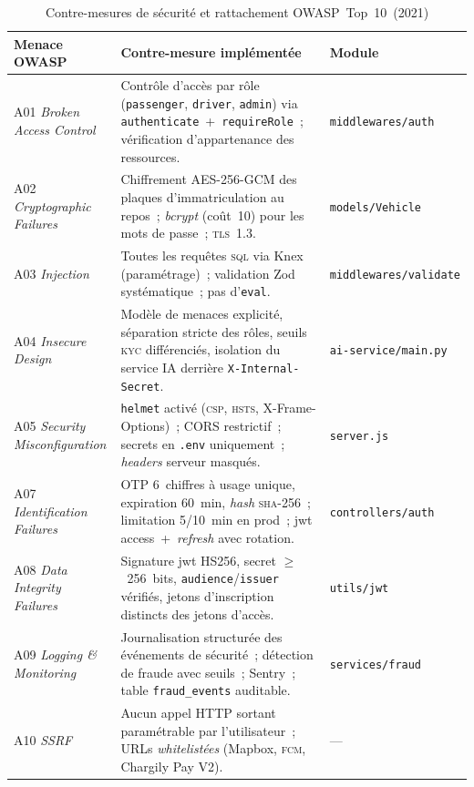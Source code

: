 \documentclass[12pt, a4paper, oneside]{report}
\begin{document}
\begin{table}[H]
\centering
\footnotesize
\renewcommand{\arraystretch}{1.25}
\begin{tabular}{|p{3.0cm}|p{8.8cm}|p{3.0cm}|}
\hline
\rowcolor{rohlight}
\textbf{Menace OWASP} & \textbf{Contre-mesure implémentée} & \textbf{Module} \\
\hline
A01 \textit{Broken Access Control} &
Contrôle d'accès par rôle (\texttt{passenger}, \texttt{driver}, \texttt{admin}) via \texttt{authenticate}~+~\texttt{requireRole}~; vérification d'appartenance des ressources. &
\texttt{middlewares/auth} \\
\hline
A02 \textit{Cryptographic Failures} &
Chiffrement AES-256-GCM des plaques d'immatriculation au repos~; \textit{bcrypt} (coût~10) pour les mots de passe~; \textsc{tls}~1.3. &
\texttt{models/Vehicle} \\
\hline
A03 \textit{Injection} &
Toutes les requêtes \textsc{sql} via Knex (paramétrage)~; validation Zod systématique~; pas d'\texttt{eval}. &
\texttt{middlewares/validate} \\
\hline
A04 \textit{Insecure Design} &
Modèle de menaces explicité, séparation stricte des rôles, seuils \textsc{kyc} différenciés, isolation du service IA derrière \texttt{X-Internal-Secret}. &
\texttt{ai-service/main.py} \\
\hline
A05 \textit{Security Misconfiguration} &
\texttt{helmet} activé (\textsc{csp}, \textsc{hsts}, X-Frame-Options)~; CORS restrictif~; secrets en \texttt{.env} uniquement~; \textit{headers} serveur masqués. &
\texttt{server.js} \\
\hline
A07 \textit{Identification Failures} &
OTP 6~chiffres à usage unique, expiration 60~min, \textit{hash} \textsc{sha-256}~; limitation 5/10~min en prod~; \gls{jwt} access~+~\textit{refresh} avec rotation. &
\texttt{controllers/auth} \\
\hline
A08 \textit{Data Integrity Failures} &
Signature \gls{jwt} HS256, secret $\geq$~256~bits, \texttt{audience}/\texttt{issuer} vérifiés, jetons d'inscription distincts des jetons d'accès. &
\texttt{utils/jwt} \\
\hline
A09 \textit{Logging \& Monitoring} &
Journalisation structurée des événements de sécurité~; détection de fraude avec seuils~; Sentry~; table \texttt{fraud\_events} auditable. &
\texttt{services/fraud} \\
\hline
A10 \textit{SSRF} &
Aucun appel HTTP sortant paramétrable par l'utilisateur~; URLs \textit{whitelistées} (Mapbox, \textsc{fcm}, Chargily Pay V2). &
--- \\
\hline
\end{tabular}
  \caption{Contre-mesures de sécurité et rattachement OWASP~Top~10~(2021)}
  \label{tab:securite}
\end{table}
\end{document}
